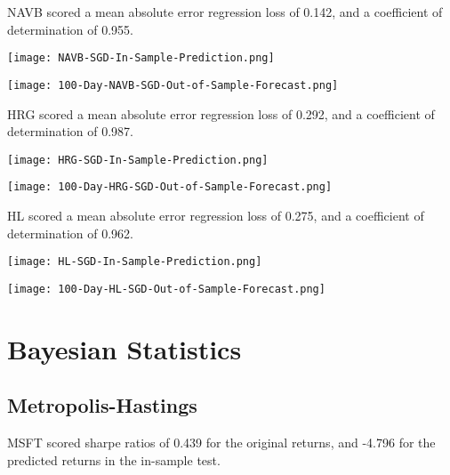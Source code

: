 NAVB scored a mean absolute error regression loss of 0.142, and a coefficient of determination of 0.955.

\begin{center}
    \texttt{[image: NAVB-SGD-In-Sample-Prediction.png]}
    \label{fig:nonfloat}
\end{center}

\begin{center}  
    \texttt{[image: 100-Day-NAVB-SGD-Out-of-Sample-Forecast.png]}
    \label{fig:nonfloat}
\end{center}

HRG scored a mean absolute error regression loss of 0.292, and a coefficient of determination of 0.987.

\begin{center}
    \texttt{[image: HRG-SGD-In-Sample-Prediction.png]}
    \label{fig:nonfloat}
\end{center}

\begin{center}  
    \texttt{[image: 100-Day-HRG-SGD-Out-of-Sample-Forecast.png]}
    \label{fig:nonfloat}
\end{center}

HL scored a mean absolute error regression loss of 0.275, and a coefficient of determination of 0.962.

\begin{center}
    \texttt{[image: HL-SGD-In-Sample-Prediction.png]}
    \label{fig:nonfloat}
\end{center}

\begin{center}  
    \texttt{[image: 100-Day-HL-SGD-Out-of-Sample-Forecast.png]}
    \label{fig:nonfloat}
\end{center}

\section{Bayesian Statistics}

\subsection{Metropolis-Hastings}
MSFT scored sharpe ratios of 0.439 for the original returns, and -4.796 for the predicted returns in the in-sample test.

